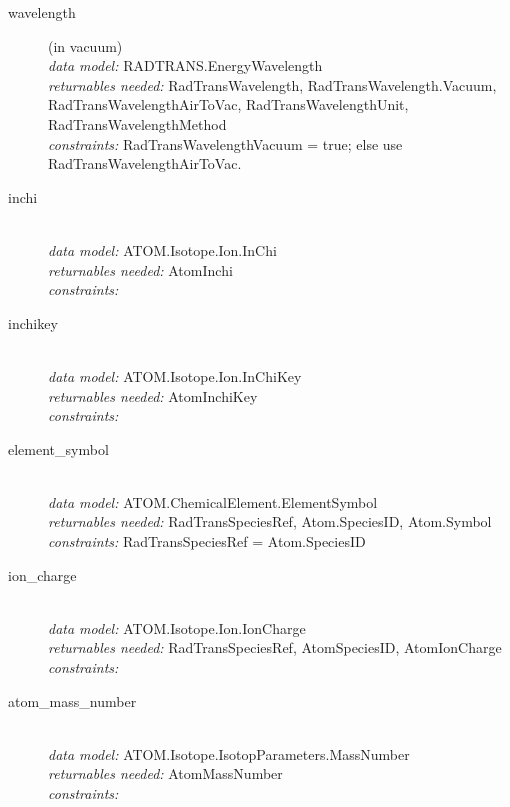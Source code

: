 \documentclass[11pt,a4paper]{ivoa}
\begin{document}
\renewcommand{\descriptionlabel}[1]{\hspace{\labelsep}\texttt{#1}}
\begin{description}

\item [wavelength] (in vacuum)\hfill\\
    \textit{data model:} RADTRANS.EnergyWavelength\\
	\textit{returnables needed:} RadTransWavelength, RadTransWavelength.Vacuum, RadTransWavelengthAirToVac, RadTransWavelengthUnit, RadTransWavelengthMethod\\
	\textit{constraints:} RadTransWavelengthVacuum = true; else use RadTransWavelengthAirToVac.\\

	\item [inchi] \hfill\\
	\textit{data model:} ATOM.Isotope.Ion.InChi\\
    \textit{returnables needed:} AtomInchi\\
	\textit{constraints:} \\

	\item [inchikey] \hfill\\
	\textit{data model:} ATOM.Isotope.Ion.InChiKey\\
    \textit{returnables needed:} AtomInchiKey\\
    \textit{constraints:} \\

\item [element\_symbol] \hfill\\
	\textit{data model:} ATOM.ChemicalElement.ElementSymbol\\
	\textit{returnables needed:} RadTransSpeciesRef, Atom.SpeciesID, Atom.Symbol
	\textit{constraints:}  RadTransSpeciesRef = Atom.SpeciesID

\item [ion\_charge]\hfill\\
	\textit{data model:} ATOM.Isotope.Ion.IonCharge\\
	\textit{returnables needed:} RadTransSpeciesRef, AtomSpeciesID, AtomIonCharge\\
	\textit{constraints:}

	\item [atom\_mass\_number]\hfill\\
	\textit{data model:} ATOM.Isotope.IsotopParameters.MassNumber\\
	\textit{returnables needed:} AtomMassNumber\\
	\textit{constraints:}


\end{description}
\end{document}

